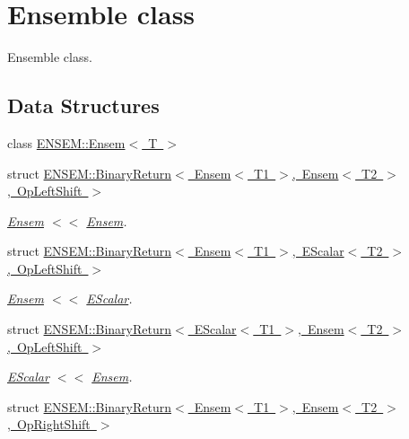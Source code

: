 \hypertarget{group__eensem}{}\section{Ensemble class}
\label{group__eensem}


Ensemble class.  


\subsection*{Data Structures}
\begin{DoxyCompactItemize}
\item 
class \mbox{\hyperlink{classENSEM_1_1Ensem}{E\+N\+S\+E\+M\+::\+Ensem$<$ T $>$}}
\item 
struct \mbox{\hyperlink{structENSEM_1_1BinaryReturn_3_01Ensem_3_01T1_01_4_00_01Ensem_3_01T2_01_4_00_01OpLeftShift_01_4}{E\+N\+S\+E\+M\+::\+Binary\+Return$<$ Ensem$<$ T1 $>$, Ensem$<$ T2 $>$, Op\+Left\+Shift $>$}}
\begin{DoxyCompactList}\small\item\em \mbox{\hyperlink{classENSEM_1_1Ensem}{Ensem}} $<$$<$ \mbox{\hyperlink{classENSEM_1_1Ensem}{Ensem}}. \end{DoxyCompactList}\item 
struct \mbox{\hyperlink{structENSEM_1_1BinaryReturn_3_01Ensem_3_01T1_01_4_00_01EScalar_3_01T2_01_4_00_01OpLeftShift_01_4}{E\+N\+S\+E\+M\+::\+Binary\+Return$<$ Ensem$<$ T1 $>$, E\+Scalar$<$ T2 $>$, Op\+Left\+Shift $>$}}
\begin{DoxyCompactList}\small\item\em \mbox{\hyperlink{classENSEM_1_1Ensem}{Ensem}} $<$$<$ \mbox{\hyperlink{classENSEM_1_1EScalar}{E\+Scalar}}. \end{DoxyCompactList}\item 
struct \mbox{\hyperlink{structENSEM_1_1BinaryReturn_3_01EScalar_3_01T1_01_4_00_01Ensem_3_01T2_01_4_00_01OpLeftShift_01_4}{E\+N\+S\+E\+M\+::\+Binary\+Return$<$ E\+Scalar$<$ T1 $>$, Ensem$<$ T2 $>$, Op\+Left\+Shift $>$}}
\begin{DoxyCompactList}\small\item\em \mbox{\hyperlink{classENSEM_1_1EScalar}{E\+Scalar}} $<$$<$ \mbox{\hyperlink{classENSEM_1_1Ensem}{Ensem}}. \end{DoxyCompactList}\item 
struct \mbox{\hyperlink{structENSEM_1_1BinaryReturn_3_01Ensem_3_01T1_01_4_00_01Ensem_3_01T2_01_4_00_01OpRightShift_01_4}{E\+N\+S\+E\+M\+::\+Binary\+Return$<$ Ensem$<$ T1 $>$, Ensem$<$ T2 $>$, Op\+Right\+Shift $>$}}

\end{DoxyCompactItemize}
